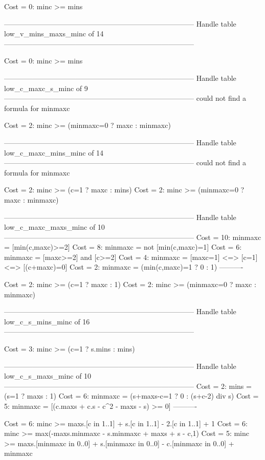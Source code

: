 Cost =  0:  minc >= mins

--------------------------------------------------------------------------------
Handle table low_v_mins_maxs_minc of 14
--------------------------------------------------------------------------------

Cost =  0:  minc >= mins

--------------------------------------------------------------------------------
Handle table low_c_maxc_s_minc of 9
--------------------------------------------------------------------------------
could not find a formula for minmaxc

Cost =  2:  minc >= (minmaxc=0 ? maxc : minmaxc)

--------------------------------------------------------------------------------
Handle table low_c_maxc_mins_minc of 14
--------------------------------------------------------------------------------
could not find a formula for minmaxc

Cost =  2:  minc >= (c=1 ? maxc : mins)
Cost =  2:  minc >= (minmaxc=0 ? maxc : minmaxc)

--------------------------------------------------------------------------------
Handle table low_c_maxc_maxs_minc of 10
--------------------------------------------------------------------------------
Cost = 10:  minmaxc = [min(c,maxc)>=2]
Cost =  8:  minmaxc = not [min(c,maxc)=1]
Cost =  6:  minmaxc = [maxc>=2] and [c>=2]
Cost =  4:  minmaxc = [maxc=1] <=> [c=1] <=> [(c+maxc)=0]
Cost =  2:  minmaxc = (min(c,maxc)=1 ? 0 : 1)
----------

Cost =  2:  minc >= (c=1 ? maxc : 1)
Cost =  2:  minc >= (minmaxc=0 ? maxc : minmaxc)

--------------------------------------------------------------------------------
Handle table low_c_s_mins_minc of 16
--------------------------------------------------------------------------------

Cost =  3:  minc >= (c=1 ? s.mins : mins)

--------------------------------------------------------------------------------
Handle table low_c_s_maxs_minc of 10
--------------------------------------------------------------------------------
Cost =  2:  mins    = (s=1 ? maxs : 1)
Cost =  6:  minmaxc = (s+maxs-c=1 ? 0 : (s+c-2) div s)
Cost =  5:  minmaxc = [(c.maxs + c.s - c^2 - maxs - s) >= 0]
----------

Cost =  6:  minc >= maxs.[c in 1..1] + s.[c in 1..1] - 2.[c in 1..1] + 1
Cost =  6:  minc >= max(-maxs.minmaxc - s.minmaxc + maxs + s - c,1)
Cost =  5:  minc >= maxs.[minmaxc in 0..0] + s.[minmaxc in 0..0] - c.[minmaxc in 0..0] + minmaxc


